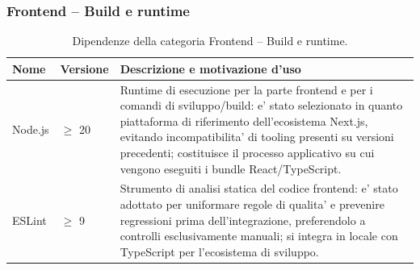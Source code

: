 \documentclass[a4paper, 11pt, oneside]{scrartcl}
\begin{document}
\subsubsection{Frontend -- Build e runtime}
\begin{table}[H]
    \centering
    \renewcommand{\arraystretch}{1.2}
    \begin{tabularx}{\textwidth}{@{}l l X@{}}
        \toprule
        \textbf{Nome} & \textbf{Versione} & \textbf{Descrizione e motivazione d'uso} \\
        \midrule
        Node.js & $\geq$ 20 & Runtime di esecuzione per la parte frontend e per i comandi di sviluppo/build: e' stato selezionato in quanto piattaforma di riferimento dell'ecosistema Next.js, evitando incompatibilita' di tooling presenti su versioni precedenti; costituisce il processo applicativo su cui vengono eseguiti i bundle React/TypeScript. \\
        ESLint & $\geq$ 9 & Strumento di analisi statica del codice frontend: e' stato adottato per uniformare regole di qualita' e prevenire regressioni prima dell'integrazione, preferendolo a controlli esclusivamente manuali; si integra in locale con TypeScript per l'ecosistema di sviluppo. \\
        \bottomrule
    \end{tabularx}
    \caption{Dipendenze della categoria Frontend -- Build e runtime.}
    \label{tab:dip_frontend_build_runtime}
\end{table}
\end{document}
